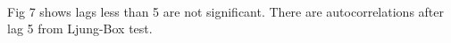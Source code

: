 \documentclass[11pt]{article}
\begin{document}
    \begin{center}
    \end{center}
    { \hspace*{\fill} \\}
    
    Fig 7 shows lags less than 5 are not significant. There are
autocorrelations after lag 5 from Ljung-Box test.


    
    
    
\end{document}
